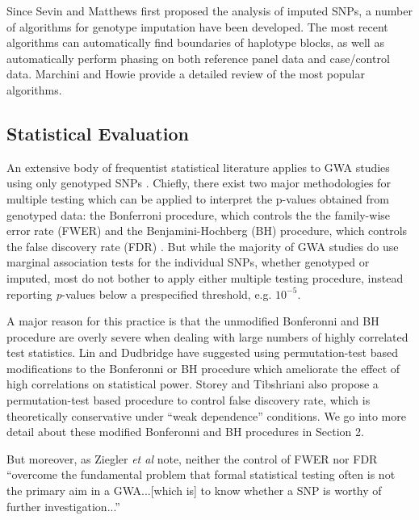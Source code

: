 \documentclass[12pt]{article}
\begin{document}
Since Sevin and Matthews first proposed the analysis of imputed SNPs,
a number of algorithms for genotype imputation have been developed.
The most recent algorithms can automatically find boundaries of
haplotype blocks, as well as automatically perform phasing on both
reference panel data and case/control data.
Marchini and Howie \cite{Marchini2010} provide a detailed review of the most
popular algorithms.

\subsection{Statistical Evaluation}

An extensive body of frequentist statistical literature applies to
GWA studies using only genotyped SNPs \cite{Ziegler2008}.
Chiefly, there exist two major methodologies for multiple testing
which can be applied to interpret the p-values obtained
from genotyped data: the Bonferroni procedure,
which controls the the family-wise error rate (FWER)
and the Benjamini-Hochberg (BH) procedure,
which controls the false discovery rate (FDR) \cite{Storey2003}.
But while the majority of GWA studies do use marginal association
tests for the individual SNPs, whether genotyped or imputed,
most do not bother to apply either multiple testing procedure,
instead reporting \emph{p}-values below a prespecified threshold, e.g.
$10^{-5}$.

A major reason for this practice is that the unmodified Bonferonni and BH
procedure are overly severe when dealing with large numbers
of highly correlated test statistics.
Lin \cite{Lin2005} and Dudbridge \cite{Dudbridge2006} have suggested
using permutation-test based modifications to the Bonferonni or BH
procedure which ameliorate the effect of high correlations on
statistical power.
Storey and Tibshriani \cite{Storey2003} also propose
a permutation-test based procedure to control false discovery rate,
which is theoretically conservative under ``weak dependence''
conditions.
We go into more detail about these modified Bonferonni and BH
procedures in Section 2.

But moreover, as Ziegler \emph{et al} note, neither the control of FWER
nor FDR
``overcome the fundamental problem that formal statistical testing often
is not the primary aim in a GWA...[which is] to know whether a SNP is
worthy of further investigation...''
\end{document}
